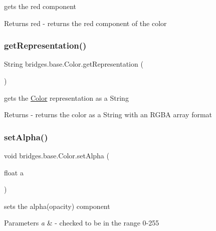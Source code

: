 gets the red component

\begin{DoxyReturn}{Returns}
red -\/ returns the red component of the color 
\end{DoxyReturn}
\mbox{\label{classbridges_1_1base_1_1_color_a2f9b0cb588e49b2ebf2f015d4d7507d0}} 
\subsubsection{\texorpdfstring{get\+Representation()}{getRepresentation()}}
{\footnotesize\ttfamily String bridges.\+base.\+Color.\+get\+Representation (\begin{DoxyParamCaption}{ }\end{DoxyParamCaption})}

gets the \mbox{\hyperlink{classbridges_1_1base_1_1_color}{Color}} representation as a String

\begin{DoxyReturn}{Returns}
-\/ returns the color as a String with an R\+G\+BA array format 
\end{DoxyReturn}
\mbox{\label{classbridges_1_1base_1_1_color_afab07ce64efa1fa5797795670b0effb6}} 
\subsubsection{\texorpdfstring{set\+Alpha()}{setAlpha()}}
{\footnotesize\ttfamily void bridges.\+base.\+Color.\+set\+Alpha (\begin{DoxyParamCaption}\item[{float}]{a }\end{DoxyParamCaption})}

sets the alpha(opacity) component


\begin{DoxyParams}{Parameters}
{\em a} & -\/ checked to be in the range 0-\/255 \\
\hline
\end{DoxyParams}
\mbox{\label{classbridges_1_1base_1_1_color_a0e04156b1573cf8002c4d9cb69825657}} 
